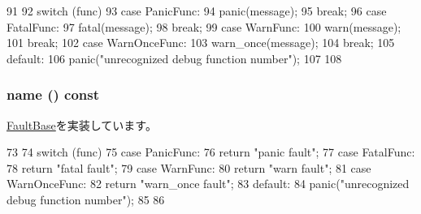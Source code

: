 \begin{DoxyCode}
91     {
92         switch (func) {
93           case PanicFunc:
94             panic(message);
95             break;
96           case FatalFunc:
97             fatal(message);
98             break;
99           case WarnFunc:
100             warn(message);
101             break;
102           case WarnOnceFunc:
103             warn_once(message);
104             break;
105           default:
106             panic("unrecognized debug function number\n");
107         }
108     }
\end{DoxyCode}
\hypertarget{classGenericISA_1_1M5DebugFault_a73adb23259baf912a81683a9790a303f}{
\subsubsection[{name}]{ name () const}}
\label{classGenericISA_1_1M5DebugFault_a73adb23259baf912a81683a9790a303f}


\hyperlink{classFaultBase_aad960357563b8b969d2dffdcc6861de7}{FaultBase}を実装しています。


\begin{DoxyCode}
73     {
74         switch (func) {
75           case PanicFunc:
76             return "panic fault";
77           case FatalFunc:
78             return "fatal fault";
79           case WarnFunc:
80             return "warn fault";
81           case WarnOnceFunc:
82             return "warn_once fault";
83           default:
84             panic("unrecognized debug function number\n");
85         }
86     }
\end{DoxyCode}


